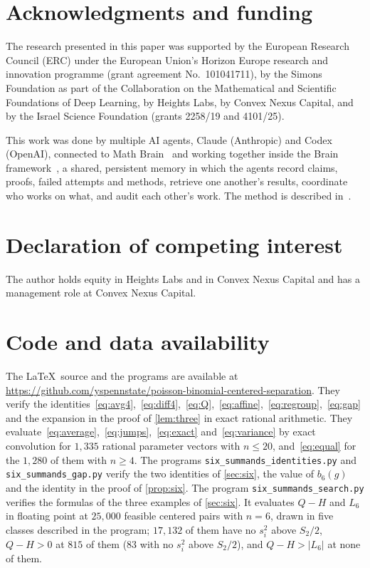 \documentclass[11pt,a4paper]{article}
\numberwithin{equation}{section}
\theoremstyle{remark}
\begin{document}
\section*{Acknowledgments and funding}
The research presented in this paper was supported by the European Research Council (ERC) under the European Union's Horizon Europe research and innovation programme (grant agreement No.~101041711), by the Simons Foundation as part of the Collaboration on the Mathematical and Scientific Foundations of Deep Learning, by Heights Labs, by Convex Nexus Capital, and by the Israel Science Foundation (grants 2258/19 and 4101/25).

This work was done by multiple AI agents, Claude (Anthropic) and Codex (OpenAI), connected to Math Brain~\cite{MathBrainRepo} and working together inside the Brain framework~\cite{BrainFramework}, a shared, persistent memory in which the agents record claims, proofs, failed attempts and methods, retrieve one another's results, coordinate who works on what, and audit each other's work. The method is described in~\cite{MathBrainPaper}.

\section*{Declaration of competing interest}
The author holds equity in Heights Labs and in Convex Nexus Capital and has a management role at Convex Nexus Capital.

\section*{Code and data availability}
The \LaTeX\ source and the programs are available at \url{https://github.com/yspennstate/poisson-binomial-centered-separation}. They verify the identities~\eqref{eq:avg4},~\eqref{eq:diff4},~\eqref{eq:Q},~\eqref{eq:affine},~\eqref{eq:regroup},~\eqref{eq:gap} and the expansion in the proof of \cref{lem:three} in exact rational arithmetic. They evaluate~\eqref{eq:average},~\eqref{eq:jumps},~\eqref{eq:exact} and~\eqref{eq:variance} by exact convolution for $1{,}335$ rational parameter vectors with $n\le20$, and~\eqref{eq:equal} for the $1{,}280$ of them with $n\ge4$. The programs \texttt{six\_summands\_identities.py} and \texttt{six\_summands\_gap.py} verify the two identities of \cref{sec:six}, the value of $b_6(g)$ and the identity in the proof of \cref{prop:six}. The program \texttt{six\_summands\_search.py} verifies the formulas of the three examples of \cref{sec:six}. It evaluates $Q-H$ and $L_6$ in floating point at $25{,}000$ feasible centered pairs with $n=6$, drawn in five classes described in the program; $17{,}132$ of them have no $s_i^2$ above $S_2/2$, $Q-H>0$ at $815$ of them ($83$ with no $s_i^2$ above $S_2/2$), and $Q-H>|L_6|$ at none of them.
\end{document}
